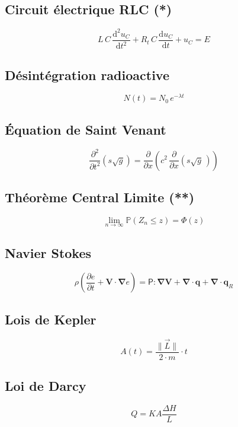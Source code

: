 \documentclass[12pt]{article}
\begin{document}
\begin{multicols}{2}
\subsection*{Circuit électrique RLC (*)}

$$ L\,C\, {\frac {\mathrm {d} ^{2}u_{C}}{\mathrm {d} t^{2}}}+R_{t}\,C\,{\frac {\mathrm {d} u_{C}}{\mathrm {d} t}}+u_{C} = E $$

\subsection*{Désintégration radioactive}

$$ N(t)=N_{0}\,e^{-{\lambda }t}$$

\subsection*{Équation de Saint Venant}

$$ {\frac {\partial ^{2}}{\partial t^{2}}}(s{\sqrt {g}})={\frac {\partial }{\partial x}}\left(c^{2}\,{\frac {\partial }{\partial x}}(s{\sqrt {g}}\,)\right)$$

\subsection*{Théorème Central Limite (**)}

$$ \lim _{n\to \infty }\mathbb {P} (Z_{n}\leq z)=\Phi (z)$$

\subsection*{Navier Stokes}

$$ \rho \left({\dfrac {\partial e}{\partial t}}+\mathbf {V} \cdot \mathbf {\nabla } e\right)={\mathsf {P}}:\mathbf {\nabla } \mathbf {V} +\mathbf {\nabla } \cdot \mathbf {q} +\mathbf {\nabla } \cdot \mathbf {q} _{R}$$

\subsection*{Lois de Kepler}
$$A(t) = {\frac{ \| {\vec {L} \|}}{2 \cdot m} \cdot t}$$

\subsection*{Loi de Darcy}

$$ Q = K A \dfrac{\Delta H}{L}$$
\end{multicols}
\end{document}
